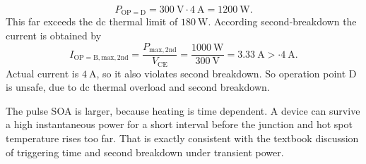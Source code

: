 \begin{solutionblock}
    \begin{equation}
        P_\mathrm{OP=D} = \SI{300}{\volt} \cdot \SI{4}{\ampere} = \SI{1200}{\watt}.
    \end{equation}
    This far exceeds the dc thermal limit of $\SI{180}{\watt}$.
    According second-breakdown the current is obtained by
    \begin{equation}
        I_\mathrm{OP=B, max,2nd} = \frac{P_\mathrm{max,2nd}} {V_\mathrm{CE}} 
        = \frac{\SI{1000}{\watt}} {\SI{300}{\volt}} = \SI{3.33}{\ampere} > \cdot \SI{4}{\ampere}.
    \end{equation}
    Actual current is $\SI{4}{\ampere}$, so it also violates second breakdown.
    So operation point D is unsafe, due to dc thermal overload and second breakdown.
\end{solutionblock} 


\begin{solutionblock}
    The pulse SOA is larger, because heating is time dependent. A device can survive a high instantaneous power for a short interval 
    before the junction and hot spot temperature rises too far. 
    That is exactly consistent with the textbook discussion of triggering time and second breakdown under transient power.
\end{solutionblock} 


